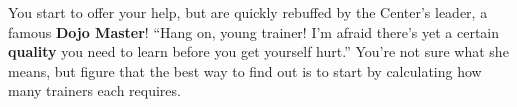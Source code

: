 You start to offer your help, but are quickly rebuffed by the \mappMobimon{}
Center's leader, a famous \textbf{Dojo Master}! ``Hang on, young trainer!
I'm afraid there's yet a certain \textbf{quality} you need to learn before
you get yourself hurt.'' You're not sure what she means, but figure that
the best way to find out is to start by calculating
how many trainers each \mappMobimon{} requires.


